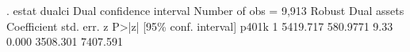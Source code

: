 . estat dualci
{\smallskip}
Dual confidence interval                                 Number of obs = 9,913
             {\VBAR}               Robust                               Dual
      assets {\VBAR} Coefficient  std. err.      z    P>|z|     [95\% conf. interval]
       p401k {\VBAR}
          1  {\VBAR}   5419.717   580.9771     9.33   0.000     3508.301    7407.591
